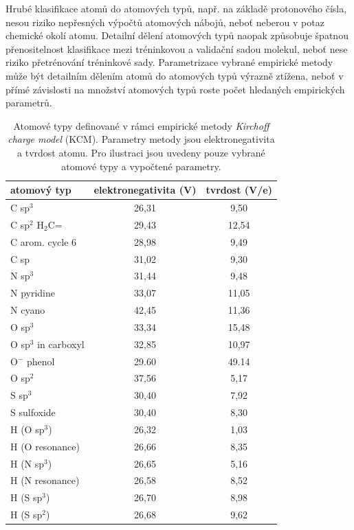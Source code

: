 
Hrubé klasifikace atomů do atomových typů, např. na základě protonového čísla, nesou riziko nepřesných výpočtů atomových nábojů, neboť neberou v potaz chemické okolí atomu. Detailní dělení atomových typů naopak způsobuje špatnou přenositelnost klasifikace mezi tréninkovou a validační sadou molekul, neboť nese riziko přetrénování tréninkové sady. Parametrizace vybrané empirické metody může být detailním dělením atomů do atomových typů výrazně ztížena, neboť v přímé závislosti na množství atomových typů roste počet hledaných empirických parametrů.
\medskip
\begin{table}[h]
    \renewcommand{\arraystretch}{1.3}
    \centering
    \begin{tabular}{l|c|c}
         \textbf{atomový typ} & \textbf{elektronegativita} (V) & \textbf{tvrdost} (V/e) \\
         \hline
         C sp$^3$ & 26,31 & 9,50\\
         C sp$^2$ H$_2$C= & 29,43 & 12,54 \\
         C arom. cycle 6 & 28,98 & 9,49 \\
         C sp & 31,02 & 9,30 \\
         N sp$^3$ & 31,44 & 9,48 \\
         N pyridine & 33,07 & 11,05 \\
         N cyano & 42,45 & 11,36 \\
         O sp$^3$ & 33,34 & 15,48 \\
         O sp$^3$ in carboxyl & 32,85 & 10,97 \\
         O$^-$ phenol & 29.60 & 49.14 \\
         O sp$^2$ & 37,56 & 5,17 \\
         S sp$^3$ & 30,40 & 7,92 \\
         S sulfoxide & 30,40 & 8,30 \\
         H (O sp$^3$) & 26,32 & 1,03 \\
         H (O resonance) & 26,66 & 8,35 \\
         H (N sp$^3$) & 26,65 & 5,16 \\
         H (N resonance) & 26,58 & 8,52 \\
         H (S sp$^3$) & 26,70 & 8,98 \\
         H (S sp$^2$) & 26,68 & 9,62\\
    
    \end{tabular}
    \caption{Atomové typy definované v rámci empirické metody \textit{Kirchoff charge model} (KCM). Parametry metody jsou elektronegativita a tvrdost atomu. Pro ilustraci jsou uvedeny pouze vybrané atomové typy a vypočtené parametry.}
    \label{atom_types_examples}
\end{table}

